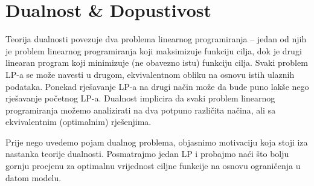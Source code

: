\documentclass[a4paper, utf8, 11pt, colorlinks]{book}
\begin{document}

  \newpage
 \chapter{Dualnost \& Dopustivost}
 
 Teorija dualnosti povezuje dva problema linearnog programiranja -- jedan od njih je problem linearnog programiranja koji maksimizuje funkciju cilja, dok je drugi linearan program  koji minimizuje (ne obavezno istu) funkciju cilja. Svaki problem LP-a se može navesti u drugom, ekvivalentnom obliku na osnovu istih ulaznih podataka. Ponekad rješavanje LP-a na drugi način može da bude puno lakše nego rješavanje početnog LP-a.  Dualnost implicira da svaki problem linearnog programiranja možemo analizirati na dva potpuno različita načina, ali sa ekvivalentnim (optimalnim) rješenjima. 
 
 Prije nego uvedemo pojam dualnog problema, objasnimo motivaciju koja stoji iza nastanka teorije dualnosti. Posmatrajmo jedan LP i probajmo naći što bolju gornju procjenu za optimalnu vrijednost ciljne funkcije na osnovu ograničenja u datom modelu.
 
\end{document}
